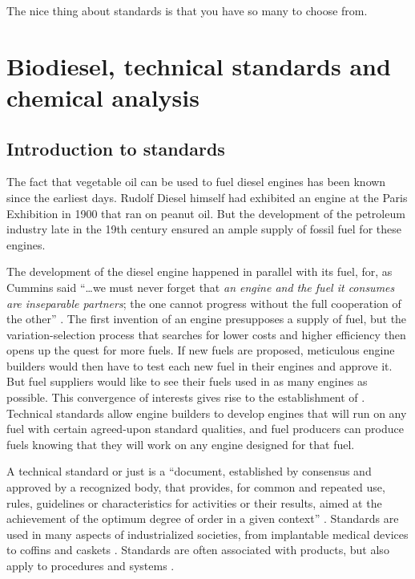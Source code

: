 
\begin{savequote}[\quotewidth]
The nice thing about standards is that you have so many to choose from.
\end{savequote}


\chapter[Biodiesel standards]{Biodiesel, technical standards and chemical analysis} %

\label{Chapter3} %

\section{Introduction to standards}
\label{Sec:Intro}

The fact that vegetable oil can be used to fuel diesel engines has been known
since the earliest days. Rudolf Diesel himself had exhibited an engine at the
Paris Exhibition in 1900 \autocite{Knothe2010} that ran on peanut oil. But the
development of the petroleum industry late in the 19th century ensured an ample
supply of fossil fuel for these engines.

The development of the diesel engine happened in parallel with its fuel, for, as
Cummins said ``\ldots we must never forget that \textit{an engine and the fuel
it consumes are inseparable partners}; the one cannot progress without the full
cooperation of the other'' \autocite{Cummins1989}. The first invention of an
engine presupposes a supply of fuel, but the variation-selection process that
searches for lower costs and higher efficiency then opens up the quest for more
fuels. If new fuels are proposed, meticulous engine builders would then have to
test each new fuel in their engines and approve it. But fuel suppliers would
like to see their fuels used in as many engines as possible. This convergence of
interests gives rise to the establishment of .
Technical standards allow engine builders to develop engines that will run on
any fuel with certain agreed-upon standard qualities, and fuel producers can
produce fuels knowing that they will work on any engine designed for that fuel.

A technical standard or just  is a ``document, established by
consensus and approved by a recognized body, that provides, for common and
repeated use, rules, guidelines or characteristics for activities or their
results, aimed at the achievement of the optimum degree of order in a given
context'' \autocite{Hatto2010}. Standards are used in many aspects of
industrialized societies, from implantable medical devices \autocite{ISO2019} to
coffins and caskets \autocite{SABS1993}. Standards are often associated with
products, but also apply to procedures \autocite{ISO2015} and systems
\autocite{ISO2017}.

